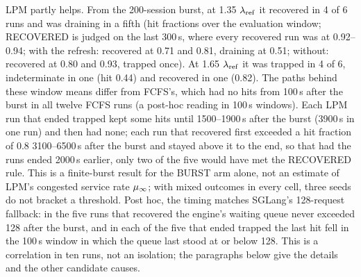 LPM partly helps. From the 200-session burst, at 1.35 $\lambda_{\mathrm{ref}}$ it recovered in 4 of 6 runs and was draining in a fifth (hit fractions over the evaluation window; RECOVERED is judged on the last 300\,s, where every recovered run was at 0.92--0.94; with the refresh: recovered at 0.71 and 0.81, draining at 0.51; without: recovered at 0.80 and 0.93, trapped once). At 1.65 $\lambda_{\mathrm{ref}}$ it was trapped in 4 of 6, indeterminate in one (hit 0.44) and recovered in one (0.82). The paths behind these window means differ from FCFS's, which had no hits from 100\,s after the burst in all twelve FCFS runs (a post-hoc reading in 100\,s windows). Each LPM run that ended trapped kept some hits until 1500--1900\,s after the burst (3900\,s in one run) and then had none; each run that recovered first exceeded a hit fraction of 0.8 3100--6500\,s after the burst and stayed above it to the end, so that had the runs ended 2000\,s earlier, only two of the five would have met the RECOVERED rule. This is a finite-burst result for the BURST arm alone, not an estimate of LPM's congested service rate $\mu_{\infty}$; with mixed outcomes in every cell, three seeds do not bracket a threshold. Post hoc, the timing matches SGLang's 128-request fallback: in the five runs that recovered the engine's waiting queue never exceeded 128 after the burst, and in each of the five that ended trapped the last hit fell in the 100\,s window in which the queue last stood at or below 128. This is a correlation in ten runs, not an isolation; the paragraphs below give the details and the other candidate causes.

